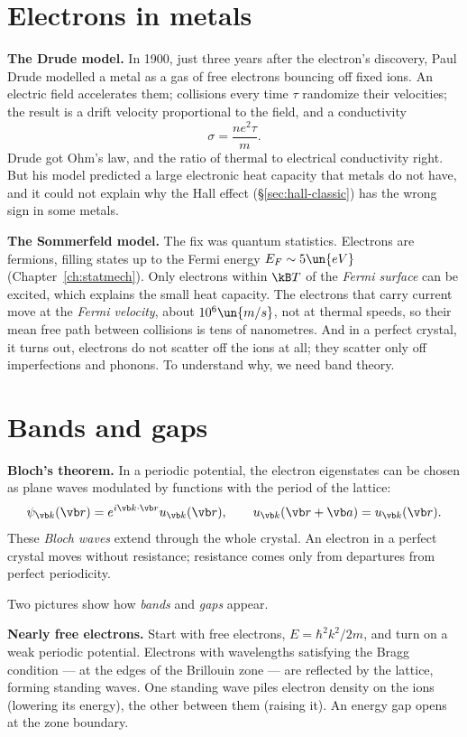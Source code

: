 \section{Electrons in metals}

\textbf{The Drude model.} In 1900, just three years after the electron's discovery, Paul Drude modelled a metal as a gas of free electrons bouncing off fixed ions. An electric field accelerates them; collisions every time $\tau$ randomize their velocities; the result is a drift velocity proportional to the field, and a conductivity
\[
  \sigma = \frac{ne^2\tau}{m}.
\]
Drude got Ohm's law, and the ratio of thermal to electrical conductivity right. But his model predicted a large electronic heat capacity that metals do not have, and it could not explain why the Hall effect (\S\ref{sec:hall-classic}) has the wrong sign in some metals.

\textbf{The Sommerfeld model.} The fix was quantum statistics. Electrons are fermions, filling states up to the Fermi energy $E_F\sim5\un{eV}$ (Chapter~\ref{ch:statmech}). Only electrons within $\kB T$ of the \emph{Fermi surface} can be excited, which explains the small heat capacity. The electrons that carry current move at the \emph{Fermi velocity}, about $10^6\un{m/s}$, not at thermal speeds, so their mean free path between collisions is tens of nanometres. And in a perfect crystal, it turns out, electrons do not scatter off the ions at all; they scatter only off imperfections and phonons. To understand why, we need band theory.

\section{Bands and gaps}

\textbf{Bloch's theorem.} In a periodic potential, the electron eigenstates can be chosen as plane waves modulated by functions with the period of the lattice:
\[
  \psi_{\vb k}(\vb r) = e^{i\vb k\cdot\vb r}u_{\vb k}(\vb r),\qquad u_{\vb k}(\vb r + \vb a) = u_{\vb k}(\vb r).
\]
These \emph{Bloch waves} extend through the whole crystal. An electron in a perfect crystal moves without resistance; resistance comes only from departures from perfect periodicity.

Two pictures show how \emph{bands} and \emph{gaps} appear.

\textbf{Nearly free electrons.} Start with free electrons, $E = \hbar^2k^2/2m$, and turn on a weak periodic potential. Electrons with wavelengths satisfying the Bragg condition --- at the edges of the Brillouin zone --- are reflected by the lattice, forming standing waves. One standing wave piles electron density on the ions (lowering its energy), the other between them (raising it). An energy gap opens at the zone boundary.


